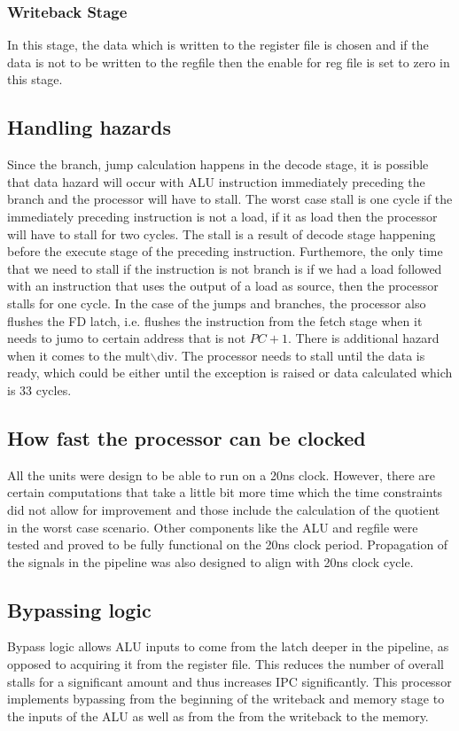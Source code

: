 \documentclass{article}
\begin{document}
\subsubsection{Writeback Stage}
In this stage, the data which is written to the register file is chosen and if the data is not to be written to the regfile then the enable for reg file is set to zero in this stage.
\subsection{Handling hazards}
Since the branch, jump calculation happens in the decode stage, it is possible that data hazard will occur with ALU instruction immediately preceding the branch and the processor will have to stall. The worst case stall is one cycle if the immediately preceding instruction is not a load, if it as load then the processor will have to stall for two cycles. The stall is a result of decode stage happening before the execute stage of the preceding instruction. Furthemore, the only time that we need to stall if the instruction is not branch is if we had a load followed with an instruction that uses the output of a load as source, then the processor stalls for one cycle. In the case of the jumps and branches, the processor also flushes the FD latch, i.e. flushes the instruction from the fetch stage when it needs to jumo to certain address that is not $PC+1$. There is additional hazard when it comes to the mult$\backslash$div. The processor needs to stall until the data is ready, which could be either until the exception is raised or data calculated which is 33 cycles.
\subsection{How fast the processor can be clocked}
All the units were design to be able to run on a 20ns clock. However, there are certain computations that take a little bit more time which the time constraints did not allow for improvement and those include the calculation of the quotient in the worst case scenario. Other components like the ALU and regfile were tested and proved to be fully functional on the 20ns clock period. Propagation of the signals in the pipeline was also designed to align with 20ns clock cycle.
\subsection{Bypassing logic}
 Bypass logic allows ALU inputs to come from the latch deeper in the pipeline, as opposed to acquiring it from the register file. This reduces the number of overall stalls for a significant amount and thus increases IPC significantly. This processor implements bypassing from the beginning of the writeback and memory stage to the inputs of the ALU as well as from the from the writeback to the memory. \\
\end{document}
